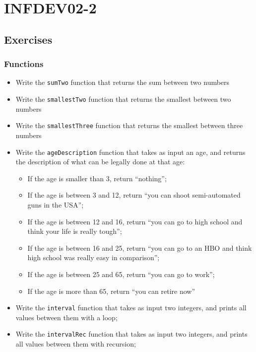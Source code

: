 \setcounter{part}{2}
\part{INFDEV02-2}
\setcounter{chapter}{0}

\chapter{Exercises}
    \section{Functions}
        \begin{itemize}
            \item Write the \texttt{sumTwo} function that returns the sum between two numbers
			\item Write the \texttt{smallestTwo} function that returns the smallest between two numbers
			\item Write the \texttt{smallestThree} function that returns the smallest between three numbers
            \item Write the \texttt{ageDescription} function that takes as input an age, and returns the description of what can be legally done at that age:
            \begin{itemize}
                \item If the age is smaller than 3, return ``nothing'';
                \item If the age is between 3 and 12, return ``you can shoot semi-automated guns in the USA'';
                \item If the age is between 12 and 16, return ``you can go to high school and think your life is really tough'';
                \item If the age is between 16 and 25, return ``you can go to an HBO and think high school was really easy in comparison'';
                \item If the age is between 25 and 65, return ``you can go to work'';
                \item If the age is more than 65, return ``you can retire now''
            \end{itemize}
            \item Write the \texttt{interval} function that takes as input two integers, and prints all values between them with a loop;
            \item Write the \texttt{intervalRec} function that takes as input two integers, and prints all values between them with recursion;

\end{itemize}
